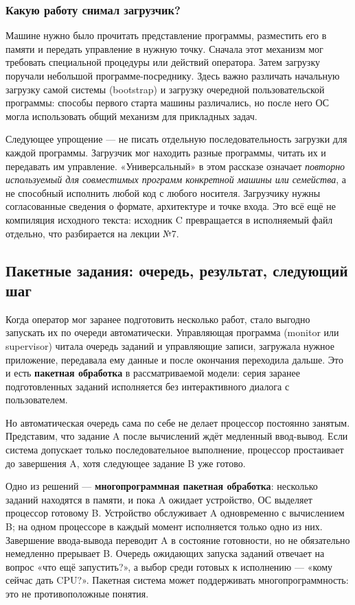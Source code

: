 \subsubsection*{Какую работу снимал загрузчик?}

Машине нужно было прочитать представление программы, разместить его в памяти и
передать управление в нужную точку. Сначала этот механизм мог требовать
специальной процедуры или действий оператора. Затем загрузку поручали
небольшой программе-посреднику. Здесь важно различать начальную загрузку самой
системы (bootstrap) и загрузку очередной пользовательской программы: способы
первого старта машины различались, но после него ОС могла использовать общий
механизм для прикладных задач.

Следующее упрощение --- не писать отдельную последовательность загрузки для
каждой программы. Загрузчик мог находить разные программы, читать их и
передавать им управление. «Универсальный» в этом рассказе означает
\emph{повторно используемый для совместимых программ конкретной машины или
семейства}, а не способный исполнить любой код с любого носителя. Загрузчику
нужны согласованные сведения о формате, архитектуре и точке входа. Это всё ещё
не компиляция исходного текста: исходник C превращается в исполняемый файл
отдельно, что разбирается на лекции №7.

\subsection{Пакетные задания: очередь, результат, следующий шаг}

Когда оператор мог заранее подготовить несколько работ, стало выгодно запускать
их по очереди автоматически. Управляющая программа (monitor или supervisor)
читала очередь заданий и управляющие записи, загружала нужное приложение,
передавала ему данные и после окончания переходила дальше. Это и есть
\textbf{пакетная обработка} в рассматриваемой модели: серия заранее
подготовленных заданий исполняется без интерактивного диалога с пользователем.

Но автоматическая очередь сама по себе не делает процессор постоянно занятым.
Представим, что задание A после вычислений ждёт медленный ввод-вывод. Если
система допускает только последовательное выполнение, процессор простаивает
до завершения A, хотя следующее задание B уже готово.

Одно из решений --- \textbf{многопрограммная пакетная обработка}: несколько
заданий находятся в памяти, и пока A ожидает устройство, ОС выделяет процессор
готовому B. Устройство обслуживает A одновременно с вычислением B; на одном
процессоре в каждый момент исполняется только одно из них. Завершение
ввода-вывода переводит A в состояние готовности, но не обязательно немедленно
прерывает B. Очередь ожидающих запуска заданий отвечает на вопрос «что ещё
запустить?», а выбор среди готовых к исполнению --- «кому сейчас дать CPU?».
Пакетная система может поддерживать многопрограммность: это не противоположные
понятия.


